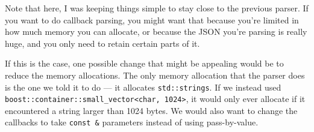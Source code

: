 Note that here, I was keeping things simple to stay close to the previous parser. If you want to do callback parsing, you might want that because you're limited in how much memory you can allocate, or because the JSON you're parsing is really huge, and you only need to retain certain parts of it.

If this is the case, one possible change that might be appealing would be to reduce the memory allocations. The only memory allocation that the parser does is the one we told it to do --- it allocates \texttt{std::strings}. If we instead used \texttt{boost::container::small\_vector<char, 1024>}, it would only ever allocate if it encountered a string larger than 1024 bytes. We would also want to change the callbacks to take \texttt{const \&} parameters instead of using pass-by-value.

